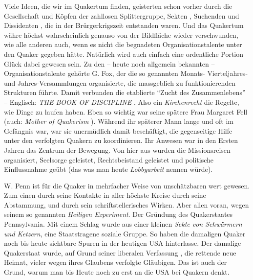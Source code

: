 \medskip

Viele Ideen, die wir im Quakertum finden, geisterten schon vorher durch die
Gesellschaft und Köpfen der zahllosen Splittergruppe, Sekten , Suchenden und
Dissidenten , die in der Brürgerkrigszeit  entstanden waren. Und das Quakertum
währe höchst wahrscheinlich genauso von der Bildfläche wieder verschwunden, wie
alle anderen auch, wenn es nicht die begnadeten Organisationstalente unter den
Quaker gegeben hätte. Natürlich wird auch einfach eine ordentliche Portion Glück
dabei gewesen sein. Zu den -- heute noch allgemein bekannten --
Organisationstalente gehörte G. Fox, der die so genannten Monats- Vierteljahres-
und Jahres-Versammlungen    organisierte, die massgeblich zu funktionierenden
Strukturen führte. Damit verbunden die etablierte "`Zucht des Zusammenlebens"' 
--
Englisch: \textit{THE BOOK OF DISCIPLINE}  . Also ein \textit{Kirchenrecht}  die
Regelte, wie Dinge zu laufen haben. Eben so wichtig war seine spätere Frau
Margaret Fell  (auch: \textit{Mother of Quakerism} ). Während ihr späterer Mann
lange und oft im Gefängnis war, war sie unermüdlich damit beschäftigt, die
gegenseitige Hilfe unter den verfolgten  Quakern zu koordinieren. Ihr Anwesen
war in den Ersten Jahren das Zentrum der Bewegung. Von hier aus wurden die
Missionsreisen organisiert, Seelsorge  geleistet, Rechtsbeistand geleistet und
politische Einflussnahme  geübt (das was man heute \textit{Lobbyarbeit}  nennen
würde).

\medskip

W. Penn ist für die Quaker in mehrfacher Weise von unschätzbaren wert gewesen.
Zum einen durch seine Kontakte in aller höchste Kreise durch seine Abstammung,
und
durch sein schriftstellerisches Wirken. Aber allen voran, wegen seinem so
genannten \textit{Heiligen Experiment}. Der Gründung des Quakerstaates  
Pennsylvania. Mit einem Schlag wurde aus einer kleinen \textit{Sekte von
Schwärmern und Ketzern}, eine Staatstragene soziale Gruppe. So haben die
damaligen Quaker noch bis heute sichtbare Spuren in der heutigen USA 
hinterlasse.
Der damalige Quakerstaat wurde, auf Grund seiner liberalen Verfassung , die
rettende neue Heimat, vieler wegen ihres Glaubens verfolgte Gläubigen. Das ist
auch der Grund, warum man bis Heute noch zu erst an die USA bei Quakern denkt.

